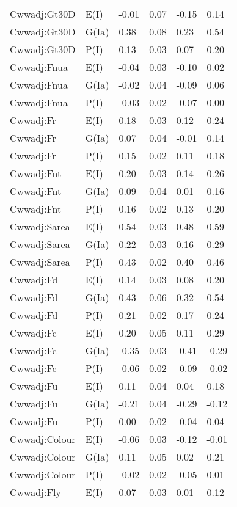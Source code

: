 \begin{center}
\begin{longtable}{|p{1.1in}|p{0.7in}|p{0.7in}|p{0.6in}|p{0.6in}|p{0.6in}|}
  Cwwadj:Gt30D & E(I) & -0.01 & 0.07 & -0.15 & 0.14 \\ 
  Cwwadj:Gt30D & G(Ia) & 0.38 & 0.08 & 0.23 & 0.54 \\ 
  Cwwadj:Gt30D & P(I) & 0.13 & 0.03 & 0.07 & 0.20 \\ 
  Cwwadj:Fnua & E(I) & -0.04 & 0.03 & -0.10 & 0.02 \\ 
  Cwwadj:Fnua & G(Ia) & -0.02 & 0.04 & -0.09 & 0.06 \\ 
  Cwwadj:Fnua & P(I) & -0.03 & 0.02 & -0.07 & 0.00 \\ 
  Cwwadj:Fr & E(I) & 0.18 & 0.03 & 0.12 & 0.24 \\ 
  Cwwadj:Fr & G(Ia) & 0.07 & 0.04 & -0.01 & 0.14 \\ 
  Cwwadj:Fr & P(I) & 0.15 & 0.02 & 0.11 & 0.18 \\ 
  Cwwadj:Fnt & E(I) & 0.20 & 0.03 & 0.14 & 0.26 \\ 
  Cwwadj:Fnt & G(Ia) & 0.09 & 0.04 & 0.01 & 0.16 \\ 
  Cwwadj:Fnt & P(I) & 0.16 & 0.02 & 0.13 & 0.20 \\ 
  Cwwadj:Sarea & E(I) & 0.54 & 0.03 & 0.48 & 0.59 \\ 
  Cwwadj:Sarea & G(Ia) & 0.22 & 0.03 & 0.16 & 0.29 \\ 
  Cwwadj:Sarea & P(I) & 0.43 & 0.02 & 0.40 & 0.46 \\ 
  Cwwadj:Fd & E(I) & 0.14 & 0.03 & 0.08 & 0.20 \\ 
  Cwwadj:Fd & G(Ia) & 0.43 & 0.06 & 0.32 & 0.54 \\ 
  Cwwadj:Fd & P(I) & 0.21 & 0.02 & 0.17 & 0.24 \\ 
  Cwwadj:Fc & E(I) & 0.20 & 0.05 & 0.11 & 0.29 \\ 
  Cwwadj:Fc & G(Ia) & -0.35 & 0.03 & -0.41 & -0.29 \\ 
  Cwwadj:Fc & P(I) & -0.06 & 0.02 & -0.09 & -0.02 \\ 
  Cwwadj:Fu & E(I) & 0.11 & 0.04 & 0.04 & 0.18 \\ 
  Cwwadj:Fu & G(Ia) & -0.21 & 0.04 & -0.29 & -0.12 \\ 
  Cwwadj:Fu & P(I) & 0.00 & 0.02 & -0.04 & 0.04 \\ 
  Cwwadj:Colour & E(I) & -0.06 & 0.03 & -0.12 & -0.01 \\ 
  Cwwadj:Colour & G(Ia) & 0.11 & 0.05 & 0.02 & 0.21 \\ 
  Cwwadj:Colour & P(I) & -0.02 & 0.02 & -0.05 & 0.01 \\ 
  Cwwadj:Fly & E(I) & 0.07 & 0.03 & 0.01 & 0.12 \\ 

\end{longtable}
\end{center}
